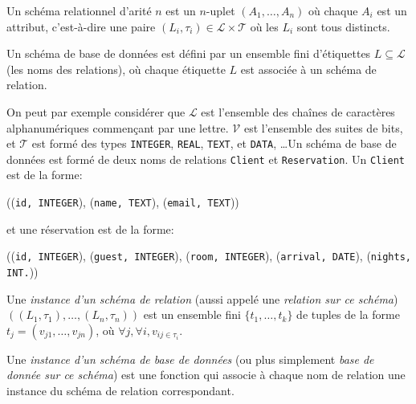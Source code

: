 \documentclass[french, toc]{../cs-classes/cs-classes}
\renewcommand*{\L}{\mathcal{L}}
\newcommand*{\V}{\mathcal{V}}
\newcommand*{\T}{\mathcal{T}}
\begin{document}
\begin{definition}
    Un schéma relationnel d'arité $n$ est un $n$-uplet $(A_1, \dots, A_n)$ où chaque $A_i$ est un attribut, c'est-à-dire une paire $(L_i, \tau_i)\in \L\times\T$ où les $L_i$ sont tous distincts.
\end{definition}

\begin{definition}
    Un schéma de base de données est défini par un ensemble fini d'étiquettes $L\subseteq\L$ (les noms des relations), où chaque étiquette $L$ est associée à un schéma de relation.
\end{definition}

\begin{exemple}
    On peut par exemple considérer que $\L$ est l'ensemble des chaînes de caractères alphanumériques commençant par une lettre. $\V$ est l'ensemble des suites de bits, et $\T$ est formé des types \texttt{INTEGER}, \texttt{REAL}, \texttt{TEXT}, et \texttt{DATA}, \dots Un schéma de base de données est formé de deux noms de relations \texttt{Client} et \texttt{Reservation}. Un \texttt{Client} est de la forme:
    \begin{center}
        ((\texttt{id, INTEGER}), (\texttt{name, TEXT}), (\texttt{email, TEXT}))
    \end{center}
    et une réservation est de la forme:
    \begin{center}
        ((\texttt{id, INTEGER}), (\texttt{guest, INTEGER}), (\texttt{room, INTEGER}), (\texttt{arrival, DATE}), (\texttt{nights, INT.}))
    \end{center}
\end{exemple}

\begin{definition}
    Une \emph{instance d'un schéma de relation} (aussi appelé une \emph{relation sur ce schéma}) $((L_1, \tau_1), \dots, (L_n, \tau_n))$ est un ensemble fini $\{t_1, \dots, t_k\}$ de tuples de la forme $t_j=(v_{j1}, \dots, v_{jn})$, où $\forall j, \forall i, v_{ij\in\tau_i}$.
\end{definition}

\begin{definition}
    Une \emph{instance d'un schéma de base de données} (ou plus simplement \emph{base de donnée sur ce schéma}) est une fonction qui associe à chaque nom de relation une instance du schéma de relation correspondant.
\end{definition}
\end{document}
